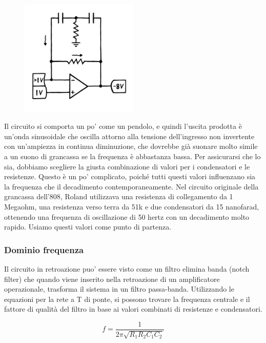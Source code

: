 \documentclass{article}
\begin{document}
\begin{figure}[ht]
    \centering
    \includegraphics[width=0.5\textwidth]{Toscillator4.png} 
    \label{fig:Toscillator4}
\end{figure}

Il circuito si comporta un po' come un pendolo, e quindi l'uscita prodotta è un'onda sinusoidale che oscilla attorno alla tensione dell'ingresso non invertente con un'ampiezza in continua diminuzione, che dovrebbe già suonare molto simile a un suono di grancassa se la frequenza è abbastanza bassa.
Per assicurarsi che lo sia, dobbiamo scegliere la giusta combinazione di valori per i condensatori e le resistenze.
Questo è un po' complicato, poiché tutti questi valori influenzano sia la frequenza che il decadimento contemporaneamente.
Nel circuito originale della grancassa dell'808, Roland utilizzava una resistenza di collegamento da 1 Megaohm, una resistenza verso terra da 51k e due condensatori da 15 nanofarad, ottenendo una frequenza di oscillazione di 50 hertz con un decadimento molto rapido.
Usiamo questi valori come punto di partenza. 

\subsubsection{Dominio frequenza}

Il circuito in retroazione puo' essere visto come un filtro elimina banda  (notch filter) 
che quando viene inserito nella retroazione di un amplificatore operazionale, trasforma il sistema in un filtro passa-banda. Utilizzando le equazioni per la rete a T di ponte, si possono trovare la frequenza centrale e il fattore di qualità del filtro in base ai valori combinati di resistenze e condensatori.

\begin{equation}
    f = \frac{1}{2 \pi\sqrt{R_1 R_2 C_1 C_2}}
\end{equation}
\end{document}
